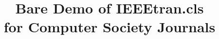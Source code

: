 \documentclass[12pt,journal,compsoc]{IEEEtran}
\begin{document}
\title{Bare Demo of IEEEtran.cls\\ for Computer Society Journals}

\author{
}





\maketitle



\end{document}
